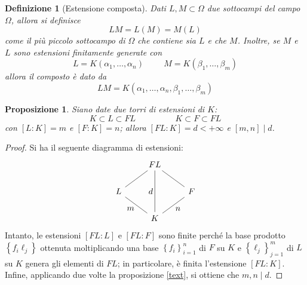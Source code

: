 \documentclass[12pt]{scrartcl}
\theoremstyle{style}
\newtheorem{definizione}{Definizione}[section]
\newtheorem{prop}{Proposizione}[section]
\numberwithin{equation}{subsection}
\begin{document}
\begin{definizione}
	[Estensione composta]
	Dati $L,M \subset \Omega $ due sottocampi del campo $\Omega $, allora si definisce
	\[
	LM = L(M) = M(L)
	\] 
	come il pi\`u piccolo sottocampo di $\Omega $ che contiene sia $L$ e che $M$.
	Inoltre, se $M$ e $L$ sono estensioni finitamente generate con
	\[
	L = K(\alpha_1,\ldots,\alpha _n) \hspace{1cm}M = K(\beta _1,\ldots,\beta _m)
	\] 
	allora il composto \`e dato da
	\[
	LM = K(\alpha _1,\ldots,\alpha _n, \beta _1,\ldots,\beta _m)
	\] 
\end{definizione}
\begin{prop}\label{gradcompext}
	Siano date due torri di estensioni di $K$:
	\[
	K \subset  L \subset FL \hspace{2cm} K \subset F \subset FL
	\] 
	con $[L:K] = m$ e $[F:K]= n$; allora $[FL:K] = d < +\infty$ e $[m,n]  \mid d$.
\end{prop}
\begin{proof}
	Si ha il seguente diagramma di estensioni:
	\[
	\begin{tikzcd}
		&  FL  & \\
		L  & &  F \\
		  &  K  & 
		  \arrow[from=3-2, to=2-1, "\displaystyle m", no head]
		  \arrow[from=3-2, to=2-3, "\displaystyle n"', no head]
		  \arrow[from=3-2, to=1-2, "\displaystyle d", no head]
		  \arrow[from=2-1, to=1-2, no head] 
		  \arrow[from=2-3, to=1-2, no head]
	\end{tikzcd}
	\] 
	Intanto, le estensioni $[FL:L]$ e $[FL:F]$ sono finite perch\'e la base prodotto $\left\{ f_i\ell _j \right\}  $ ottenuta moltiplicando una base $\left\{ f_i \right\} _{i=1} ^n$ di $F$ su $K$ e $\left\{ \ell _j \right\}_{j=1} ^m $ di $L$ su $K$ genera gli elementi di $FL$; in particolare, \`e finita l'estensione $[FL:K]$.
	Infine, applicando due volte la proposizione \ref{text}, si ottiene che $m,n \mid d$. 
\end{proof}
\end{document}
